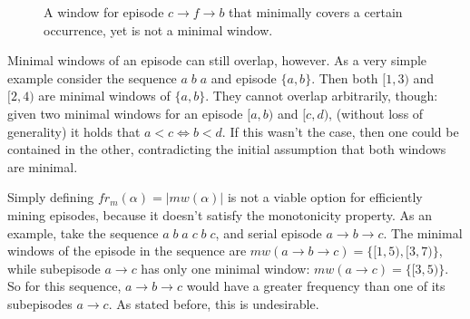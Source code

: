 \begin{figure}
\centering


\caption{A window for episode $ c \to f \to b $ that minimally covers a certain occurrence, yet is not a minimal window.}
\label{fig:mwi-non-minimal-window}
\end{figure}

Minimal windows of an episode can still overlap, however. As a very simple example consider the sequence $ a\;b\;a $ and episode $ \{ a, b \} $. Then both $ [1, 3) $ and $ [2, 4) $ are minimal windows of $ \{ a, b \} $. They cannot overlap arbitrarily, though: given two minimal windows for an episode $ [a, b) $ and $ [c, d) $, (without loss of generality) it holds that $ a < c \Leftrightarrow b < d $. If this wasn't the case, then one could be contained in the other, contradicting the initial assumption that both windows are minimal.

Simply defining $ fr_m(\alpha) = | mw(\alpha) | $ is not a viable option for efficiently mining episodes, because it doesn't satisfy the monotonicity property. As an example, take the sequence $ a\;b\;a\;c\;b\;c $, and serial episode $ a \to b \to c $. The minimal windows of the episode in the sequence are $ mw(a \to b \to c) = \{ [1, 5), [3, 7) \} $, while subepisode $ a \to c $ has only one minimal window: $ mw(a \to c) = \{ [3, 5) \} $. So for this sequence, $ a \to b \to c $ would have a greater frequency than one of its subepisodes $ a \to c $. As stated before, this is undesirable.

